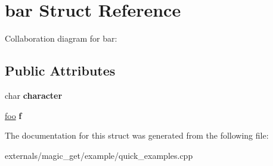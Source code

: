 \hypertarget{structbar}{}\section{bar Struct Reference}
\label{structbar}


Collaboration diagram for bar\+:
\subsection*{Public Attributes}
\begin{DoxyCompactItemize}
\item 
\mbox{\label{structbar_ac5b6e3af011f7e662a1f7832ddb57466}} 
char {\bfseries character}
\item 
\mbox{\label{structbar_a65f70844a5d117f33213aa691823d59e}} 
\mbox{\hyperlink{classfoo}{foo}} {\bfseries f}
\end{DoxyCompactItemize}


The documentation for this struct was generated from the following file\+:\begin{DoxyCompactItemize}
\item 
externals/magic\+\_\+get/example/quick\+\_\+examples.\+cpp\end{DoxyCompactItemize}
